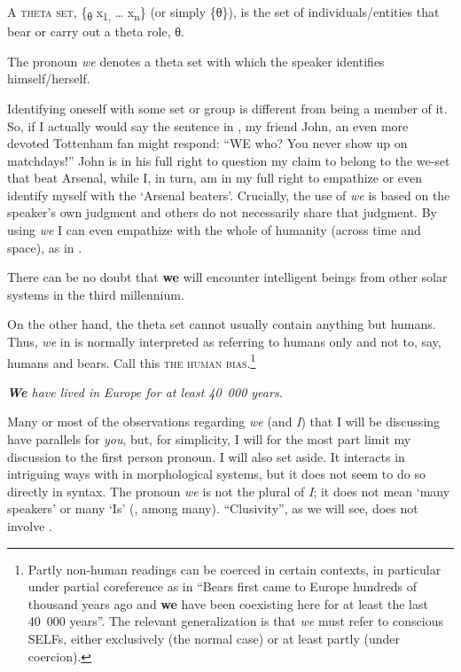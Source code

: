 \documentclass[output=paper]{LSP/langsci}
\begin{document}
\ea%
    \label{ex:Sigurdsson:5}
\ea
  A \textsc{theta set}, \{\textsubscript{θ} x\textsubscript{1,} … x\textsubscript{n}\} (or simply \{θ\}), is the set of individuals/entities that bear   or carry out a theta role, θ.

\ex  The pronoun \textit{we} denotes a theta set with which the speaker identifies himself/herself.
\z
\z

Identifying oneself with some set or group is different from being a member of it. So, if I actually would say the sentence in , my friend John, an even more devoted Tottenham fan might respond: “WE who? You never show up on matchdays!” John is in his full right to question my claim to belong to the we-set that beat Arsenal, while I, in turn, am in my full right to empathize or even identify myself with the ‘Arsenal beaters’. Crucially, the use of \textit{we} is based on the speaker’s own judgment and others do not necessarily share that judgment. By using \textit{we} I can even empathize with the whole of humanity (across time and space), as in .

\ea%
    \label{ex:Sigurdsson:6}
     There can be no doubt that \textbf{we} will encounter intelligent beings from other solar systems in the third millennium.
\z

On the other hand, the theta set cannot usually contain anything but humans. Thus, \textit{we} in  is normally interpreted as referring to humans only and not to, say, humans and bears. Call this \textsc{the human bias}.\footnote{Partly non-human readings can be coerced in certain contexts, in particular under partial coreference as in  “Bears first came to Europe hundreds of thousand years ago and \textbf{we} have been coexisting here for at least the last 40~000 years”. The relevant generalization is that \textit{we} must refer to conscious SELFs, either exclusively (the normal case) or at least partly (under coercion).}

\ea%
    \label{ex:Sigurdsson:7}
	   \itshape\textbf{We} have lived in Europe for at least 40~000 years.
\z

Many or most of the observations regarding \textit{we} (and \textit{I}) that I will be discussing have parallels for \textit{you}, but, for simplicity, I will for the most part limit my discussion to the first person pronoun. I will also set  aside. It interacts in intriguing ways with  in morphological  systems, but it does not seem to do so directly in syntax. The pronoun \textit{we} is not the plural of \textit{I}; it does not mean ‘many speakers’ or many ‘Is’ (\citealt{Boas1911,Benveniste1966,Lyons1968,Cysouw2003,Siewierska2004,Bobaljik2008}, among many). “Clusivity”, as we will see, does not involve .
\end{document}
